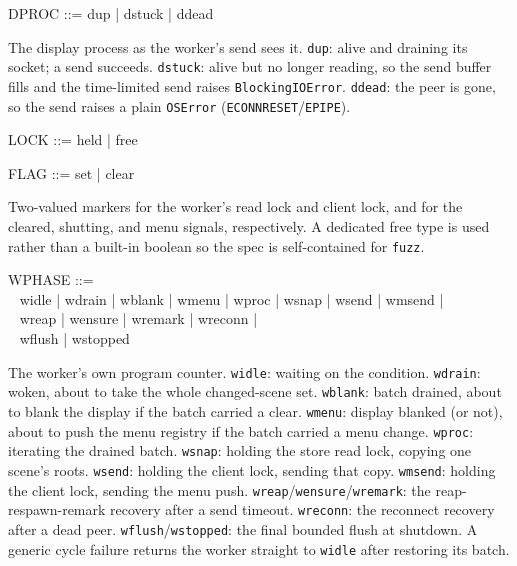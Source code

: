 \documentclass[a4paper,10pt,fleqn]{article}
\begin{document}
\begin{zed}
  DPROC ::= dup | dstuck | ddead
\end{zed}

The display process as the worker's send sees it.  \texttt{dup}: alive and
draining its socket; a send succeeds.  \texttt{dstuck}: alive but no longer
reading, so the send buffer fills and the time-limited send raises
\texttt{BlockingIOError}.  \texttt{ddead}: the peer is gone, so the send
raises a plain \texttt{OSError} (\texttt{ECONNRESET}/\texttt{EPIPE}).

\begin{zed}
  LOCK ::= held | free
\end{zed}

\begin{zed}
  FLAG ::= set | clear
\end{zed}

Two-valued markers for the worker's read lock and client lock, and for the
cleared, shutting, and menu signals, respectively.  A dedicated free type is
used rather than a built-in boolean so the spec is self-contained for
\texttt{fuzz}.

\begin{zed}
  WPHASE ::= \\
  \quad~ widle | wdrain | wblank | wmenu | wproc | wsnap | wsend | wmsend | \\
  \quad~ wreap | wensure | wremark | wreconn | \\
  \quad~ wflush | wstopped
\end{zed}

The worker's own program counter.  \texttt{widle}: waiting on the
condition.  \texttt{wdrain}: woken, about to take the whole changed-scene
set.  \texttt{wblank}: batch drained, about to blank the display if the
batch carried a clear.  \texttt{wmenu}: display blanked (or not), about to
push the menu registry if the batch carried a menu change.  \texttt{wproc}:
iterating the drained batch.  \texttt{wsnap}: holding the store read lock,
copying one scene's roots.  \texttt{wsend}: holding the client lock, sending
that copy.  \texttt{wmsend}: holding the client lock, sending the menu push.
\texttt{wreap}/\texttt{wensure}/\texttt{wremark}: the reap-respawn-remark
recovery after a send timeout.  \texttt{wreconn}: the reconnect recovery
after a dead peer.  \texttt{wflush}/\texttt{wstopped}: the final bounded
flush at shutdown.  A generic cycle failure returns the worker straight to
\texttt{widle} after restoring its batch.

\end{document}
